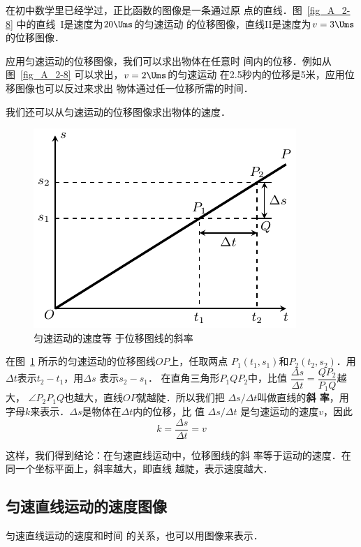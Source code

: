 在初中数学里已经学过，正比函数的图像是一条通过原
点的直线．图~\ref{fig_A_2-8} 中的直线~I是速度为$20 \Ums$的匀速运动
的位移图像，直线II是速度为$v=3 \Ums$的位移图像．


    应用匀速运动的位移图像，我们可以求出物体在任意时
间内的位移．例如从图~\ref{fig_A_2-8} 可以求出，$v=2\Ums$的匀速运动
在2.5秒内的位移是5米，应用位移图像也可以反过来求出
物体通过任一位移所需的时间．


我们还可以从匀速运动的位移图像求出物体的速度．

\begin{figure}[htp]
    \centering
    \includegraphics{fig/A/2-9.pdf}
    \caption{匀速运动的速度等
    于位移图线的斜率}\label{fig_A_2-9}
\end{figure}

    在图~\ref{fig_A_2-9} 所示的匀速运动的位移图线$OP$上，任取两点
    $P_1(t_1,s_1)$和$P_2(t_2,s_2)$．用$\Delta t$表示$t_2-t_1$，用$\Delta s$
    表示$s_2-s_1$．
    在直角三角形$P_1QP_2$中，比值
    $\dfrac{\Delta s}{\Delta t}=\dfrac{QP_2}{P_1Q}$越大，
$\angle P_2P_1Q$也越大，直线$OP$就越陡．所以我们把
$\Delta s/\Delta t$叫做直线的\textbf{斜
率}，用字母$k$来表示．$\Delta s$是物体在$\Delta t$内的位移，比
值 $\Delta s/\Delta t$
是匀速运动的速度$v$，因此
\[k=\frac{\Delta s}{\Delta t}=v\]

这样，我们得到结论：在匀速直线运动中，位移图线的斜
率等于运动的速度．在同一个坐标平面上，斜率越大，即直线
越陡，表示速度越大．

 
\subsection{匀速直线运动的速度图像} 

匀速直线运动的速度和时间
的关系，也可以用图像来表示．

